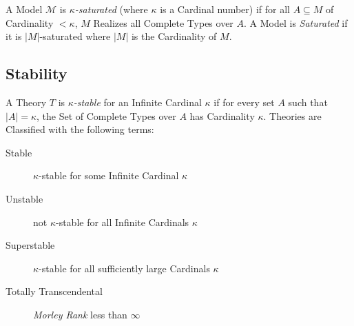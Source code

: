 A Model $\mathcal{M}$ is \emph{$\kappa$-saturated} (where $\kappa$ is
a Cardinal number) if for all $A \subseteq M$ of Cardinality $<
\kappa$, $M$ Realizes all Complete Types over $A$. A Model is
\emph{Saturated} if it is $|M|$-saturated where $|M|$ is the
Cardinality of $M$.



\subsection{Stability}\label{sec:model_stability}

A Theory $T$ is \emph{$\kappa$-stable} for an Infinite Cardinal $\kappa$
if for every set $A$ such that $|A| = \kappa$, the Set of Complete
Types over $A$ has Cardinality $\kappa$. Theories are Classified with
the following terms:
\begin{description}
\item [Stable] $\kappa$-stable for some Infinite Cardinal $\kappa$
\item [Unstable] not $\kappa$-stable for all Infinite Cardinals $\kappa$
\item [Superstable] $\kappa$-stable for all sufficiently large
  Cardinals $\kappa$
\item [Totally Transcendental] \emph{Morley Rank}\cite{morley65} less
  than $\infty$
\end{description}
